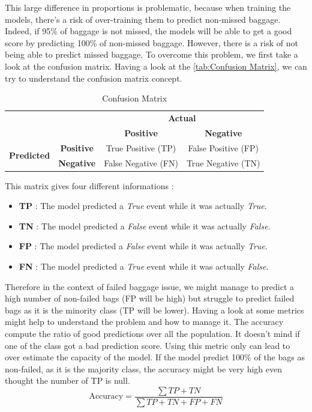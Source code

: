 \documentclass[12pt]{article}
\begin{document}
This large difference in proportions is problematic, because when training the models, there's a risk of over-training them to predict non-missed baggage. Indeed, if 95\% of baggage is not missed, the models will be able to get a good score by predicting 100\% of non-missed baggage. However, there is a risk of not being able to predict missed baggage. To overcome this problem, we first take a look at the confusion matrix. Having a look at the \autoref{tab:Confusion Matrix}, we can try to understand the confusion matrix concept. 
\begin{table}[htbp]
    \centering
    \captionsetup{justification=centering}
    \caption{Confusion Matrix}
    \label{tab:Confusion Matrix}
    \newcommand{\cellcolorpos}{\cellcolor{cyan!20}}
    \newcommand{\cellcolorneg}{\cellcolor{yellow!20}}
    \begin{tabular}{cc|c|c|}
        \cline{3-4}
        & & \multicolumn{2}{c|}{\textbf{Actual}} \\
        \cline{3-4}
        & & \textbf{Positive} & \textbf{Negative} \\
        \hline
        \multicolumn{1}{|c|}{\multirow{2}{*}{\textbf{Predicted}}}
        & \textbf{Positive} & \cellcolorpos True Positive (TP) & \cellcolorneg False Positive (FP) \\
        \cline{2-4}
        \multicolumn{1}{|c|}{}
        & \textbf{Negative} & \cellcolorneg False Negative (FN) & \cellcolorpos True Negative (TN) \\
        \hline
    \end{tabular}
\end{table}
\noindent This matrix gives four different informations : 
\begin{itemize}
\centering
    \item \textbf{TP} : The model predicted a \textit{True} event while it was actually \textit{True}.
    \item \textbf{TN} : The model predicted a \textit{False} event while it was actually \textit{False}.
    \item \textbf{FP} : The model predicted a \textit{False} event while it was actually \textit{True}.
    \item \textbf{FN} : The model predicted a \textit{True} event while it was actually \textit{False}.
\end{itemize}

Therefore in the context of failed baggage issue, we might manage to predict a high number of non-failed bags (FP will be high) but struggle to predict failed bags as it is the minority class (TP will be lower). 
Having a look at some metrics might help to understand the problem and how to manage it.
The accuracy compute the ratio of good predictions over all the population. It doesn't mind if one of the class got a bad prediction score. Using this metric only can lead to over estimate the capacity of the model. If the model predict 100\% of the bags as non-failed, as it is the majority class, the accuracy might be very high even thought the number of TP is null. 
\begin{equation}
\text{Accuracy} = \frac{\sum{TP + TN}}{\sum{TP + TN + FP + FN}}    
\end{equation}
\end{document}
